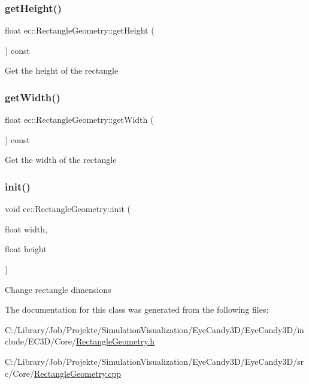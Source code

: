 \subsubsection{\texorpdfstring{get\+Height()}{getHeight()}}
{\footnotesize\ttfamily float ec\+::\+Rectangle\+Geometry\+::get\+Height (\begin{DoxyParamCaption}{ }\end{DoxyParamCaption}) const}

Get the height of the rectangle \mbox{\label{classec_1_1_rectangle_geometry_a1f75cd7d531e23fe3ccaff67178e0a08}} 
\subsubsection{\texorpdfstring{get\+Width()}{getWidth()}}
{\footnotesize\ttfamily float ec\+::\+Rectangle\+Geometry\+::get\+Width (\begin{DoxyParamCaption}{ }\end{DoxyParamCaption}) const}

Get the width of the rectangle \mbox{\label{classec_1_1_rectangle_geometry_ac6dd804a2fa2b253b71408dae5a08265}} 
\subsubsection{\texorpdfstring{init()}{init()}}
{\footnotesize\ttfamily void ec\+::\+Rectangle\+Geometry\+::init (\begin{DoxyParamCaption}\item[{float}]{width,  }\item[{float}]{height }\end{DoxyParamCaption})}

Change rectangle dimensions 

The documentation for this class was generated from the following files\+:\begin{DoxyCompactItemize}
\item 
C\+:/\+Library/\+Job/\+Projekte/\+Simulation\+Visualization/\+Eye\+Candy3\+D/\+Eye\+Candy3\+D/include/\+E\+C3\+D/\+Core/\mbox{\hyperlink{_rectangle_geometry_8h}{Rectangle\+Geometry.\+h}}\item 
C\+:/\+Library/\+Job/\+Projekte/\+Simulation\+Visualization/\+Eye\+Candy3\+D/\+Eye\+Candy3\+D/src/\+Core/\mbox{\hyperlink{_rectangle_geometry_8cpp}{Rectangle\+Geometry.\+cpp}}\end{DoxyCompactItemize}
